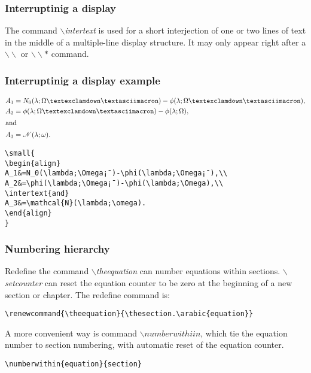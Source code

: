 \documentclass[12pt]{beamer}
\begin{document}
\begin{frame}
  \frametitle{Interruptinig a display}
  The command $\backslash$\emph{intertext} is used for a short interjection of one or two lines of text in the middle of a multiple-line display structure. It may only appear right after a $\backslash\backslash$ or $\backslash\backslash\ast$ command.
\end{frame}
\begin{frame}[fragile]
  \frametitle{Interruptinig a display example}
  \small{\begin{align}
            A_1&=N_0(\lambda;\Omega¡¯)-\phi(\lambda;\Omega¡¯),\\
            A_2&=\phi(\lambda;\Omega¡¯)-\phi(\lambda;\Omega),\\
            \intertext{and}
            A_3&=\mathcal{N}(\lambda;\omega).
        \end{align}
  }
  \begin{verbatim}
\small{
\begin{align}
A_1&=N_0(\lambda;\Omega¡¯)-\phi(\lambda;\Omega¡¯),\\
A_2&=\phi(\lambda;\Omega¡¯)-\phi(\lambda;\Omega),\\
\intertext{and}
A_3&=\mathcal{N}(\lambda;\omega).
\end{align}
}
  \end{verbatim}

\end{frame}

\begin{frame}[fragile]
  \frametitle{Numbering hierarchy}
  Redefine the command $\backslash$\emph{theequation} can number equations within sections. $\backslash$\emph{setcounter} can reset the equation counter to be zero at the beginning of a new section or chapter. The redefine command is:\\
  \tiny{\begin{verbatim}
\renewcommand{\theequation}{\thesection.\arabic{equation}}
  \end{verbatim}
  }
  \small{}
  A more convenient way is command $\backslash$\emph{$numberwithiin$}, which tie the equation number to section numbering, with automatic reset of the equation counter.\\
  \begin{verbatim}
\numberwithin{equation}{section}
  \end{verbatim}
\end{frame}
\end{document}
